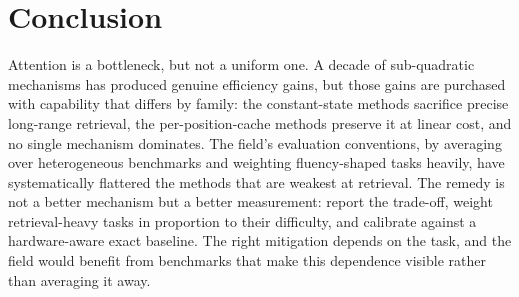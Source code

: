 \documentclass[11pt]{article}
\begin{document}
\section{Conclusion}
\label{sec:conclusion}

Attention is a bottleneck, but not a uniform one. A decade of sub-quadratic mechanisms has produced genuine efficiency gains, but those gains are purchased with capability that differs by family: the constant-state methods sacrifice precise long-range retrieval, the per-position-cache methods preserve it at linear cost, and no single mechanism dominates. The field's evaluation conventions, by averaging over heterogeneous benchmarks and weighting fluency-shaped tasks heavily, have systematically flattered the methods that are weakest at retrieval. The remedy is not a better mechanism but a better measurement: report the trade-off, weight retrieval-heavy tasks in proportion to their difficulty, and calibrate against a hardware-aware exact baseline. The right mitigation depends on the task, and the field would benefit from benchmarks that make this dependence visible rather than averaging it away.
\end{document}
